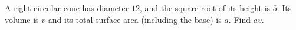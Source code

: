 A right circular cone has diameter $12$, and the square root of its height is $5$. Its volume is $v$ and its total surface area (including the base) is $a$. Find $av$.
